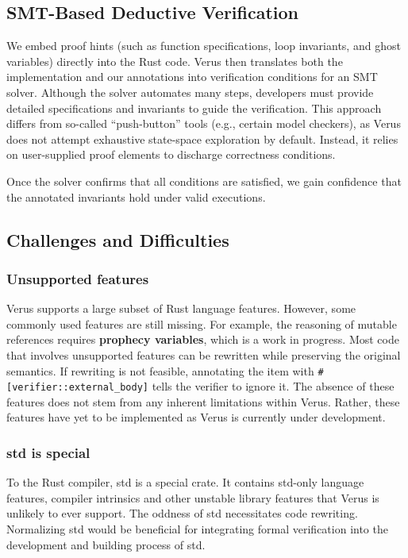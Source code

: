 \documentclass[conference]{IEEEtran}
\begin{document}
\subsection{SMT-Based Deductive Verification}

We embed proof hints (such as function specifications, loop invariants, and ghost variables) directly into the Rust code. Verus then translates both the implementation and our annotations into verification conditions for an SMT solver. Although the solver automates many steps, developers must provide detailed specifications and invariants to guide the verification. This approach differs from so-called “push-button” tools (e.g., certain model checkers), as Verus does not attempt exhaustive state-space exploration by default. Instead, it relies on user-supplied proof elements to discharge correctness conditions. 

Once the solver confirms that all conditions are satisfied, we gain confidence that the annotated invariants hold under valid executions.

\subsection{Challenges and Difficulties}
\subsubsection{Unsupported features} 
Verus supports a large subset of Rust language features. However, some commonly used features are still missing. For example, the reasoning of mutable references requires \textbf{prophecy variables}\cite{Prophecy}, which is a work in progress. Most code that involves unsupported features can be rewritten while preserving the original semantics. If rewriting is not feasible, annotating the item with \texttt{\#[verifier::external\_body]} tells the verifier to ignore it. The absence of these features does not stem from any inherent limitations within Verus. Rather, these features have yet to be implemented as Verus is currently under development.  

\subsubsection{std is special}
To the Rust compiler, std is a special crate. It contains std-only language features, compiler intrinsics and other unstable library features that Verus is unlikely to ever support. The oddness of std necessitates code rewriting. Normalizing std would be beneficial for integrating formal verification into the development and building process of std.     
\end{document}
